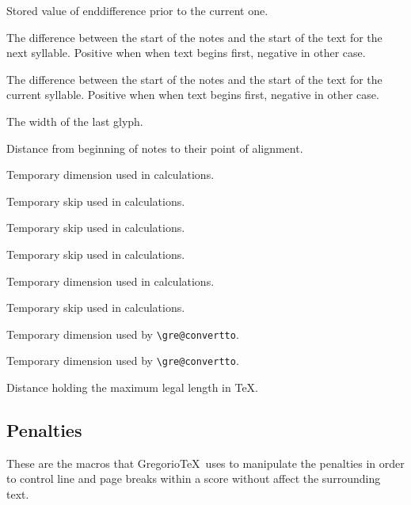 Stored value of enddifference prior to the current one.

The difference between the start of the notes and the start of the text for the next syllable.  Positive when when text begins first, negative in other case.

The difference between the start of the notes and the start of the text for the current syllable.  Positive when when text begins first, negative in other case.

The width of the last glyph.

Distance from beginning of notes to their point of alignment.

Temporary dimension used in calculations.

Temporary skip used in calculations.

Temporary skip used in calculations.

Temporary skip used in calculations.

Temporary dimension used in calculations.

Temporary skip used in calculations.

Temporary dimension used by \verb=\gre@convertto=.

Temporary dimension used by \verb=\gre@convertto=.

Distance holding the maximum legal length in TeX.


\subsection{Penalties}
These are the macros that Gregorio\TeX\ uses to manipulate the penalties in order to control line and page breaks within a score without affect the surrounding text.


